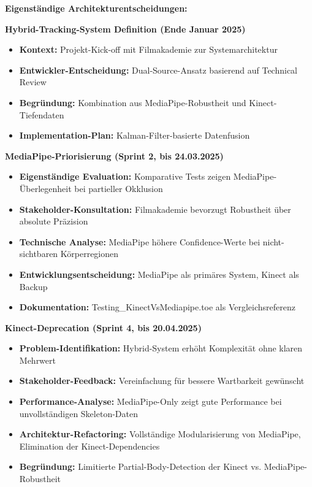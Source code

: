 \textbf{Eigenständige Architekturentscheidungen:}

\textbf{Hybrid-Tracking-System Definition (Ende Januar 2025)}
\begin{itemize}
    \item \textbf{Kontext:} Projekt-Kick-off mit Filmakademie zur Systemarchitektur
    \item \textbf{Entwickler-Entscheidung:} Dual-Source-Ansatz basierend auf Technical Review
    \item \textbf{Begründung:} Kombination aus MediaPipe-Robustheit und Kinect-Tiefendaten
    \item \textbf{Implementation-Plan:} Kalman-Filter-basierte Datenfusion
\end{itemize}

\textbf{MediaPipe-Priorisierung (Sprint 2, bis 24.03.2025)}
\begin{itemize}
    \item \textbf{Eigenständige Evaluation:} Komparative Tests zeigen MediaPipe-Überlegenheit bei partieller Okklusion
    \item \textbf{Stakeholder-Konsultation:} Filmakademie bevorzugt Robustheit über absolute Präzision
    \item \textbf{Technische Analyse:} MediaPipe höhere Confidence-Werte bei nicht-sichtbaren Körperregionen
    \item \textbf{Entwicklungsentscheidung:} MediaPipe als primäres System, Kinect als Backup
    \item \textbf{Dokumentation:} Testing\_KinectVsMediapipe.toe als Vergleichsreferenz
\end{itemize}

\textbf{Kinect-Deprecation (Sprint 4, bis 20.04.2025)}
\begin{itemize}
    \item \textbf{Problem-Identifikation:} Hybrid-System erhöht Komplexität ohne klaren Mehrwert
    \item \textbf{Stakeholder-Feedback:} Vereinfachung für bessere Wartbarkeit gewünscht
    \item \textbf{Performance-Analyse:} MediaPipe-Only zeigt gute Performance bei unvollständigen Skeleton-Daten
    \item \textbf{Architektur-Refactoring:} Vollständige Modularisierung von MediaPipe, Elimination der Kinect-Dependencies
    \item \textbf{Begründung:} Limitierte Partial-Body-Detection der Kinect vs. MediaPipe-Robustheit
\end{itemize}

